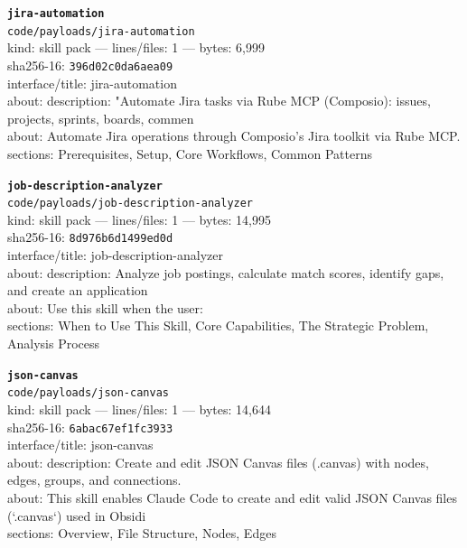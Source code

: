 \noindent\textbf{\texttt{jira-automation}}\\
\texttt{code/payloads/jira-automation}\\
kind: skill pack --- lines/files: 1 --- bytes: 6,999\\
sha256-16: \texttt{396d02c0da6aea09}\\
interface/title: jira-automation\\
about: description: "Automate Jira tasks via Rube MCP (Composio): issues, projects, sprints, boards, commen\\
about: Automate Jira operations through Composio's Jira toolkit via Rube MCP.\\
sections: Prerequisites, Setup, Core Workflows, Common Patterns\\
\vspace*{6.0pt}

\noindent\textbf{\texttt{job-description-analyzer}}\\
\texttt{code/payloads/job-description-analyzer}\\
kind: skill pack --- lines/files: 1 --- bytes: 14,995\\
sha256-16: \texttt{8d976b6d1499ed0d}\\
interface/title: job-description-analyzer\\
about: description: Analyze job postings, calculate match scores, identify gaps, and create an application \\
about: Use this skill when the user:\\
sections: When to Use This Skill, Core Capabilities, The Strategic Problem, Analysis Process\\
\vspace*{6.0pt}

\noindent\textbf{\texttt{json-canvas}}\\
\texttt{code/payloads/json-canvas}\\
kind: skill pack --- lines/files: 1 --- bytes: 14,644\\
sha256-16: \texttt{6abac67ef1fc3933}\\
interface/title: json-canvas\\
about: description: Create and edit JSON Canvas files (.canvas) with nodes, edges, groups, and connections.\\
about: This skill enables Claude Code to create and edit valid JSON Canvas files (`.canvas`) used in Obsidi\\
sections: Overview, File Structure, Nodes, Edges\\
\vspace*{6.0pt}

